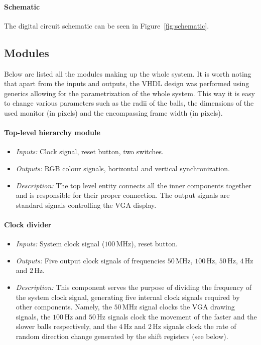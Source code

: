 \documentclass[11pt,a4paper]{article}
\def\MHz{\,\mathrm{MHz}}
\def\Hz{\,\mathrm{Hz}}
\begin{document}
        \paragraph{Schematic} The digital circuit schematic can be seen in Figure~\ref{fig:schematic}.

    \subsection*{Modules}
        Below are listed all the modules making up the whole system. It is worth noting that apart from the inputs and outputs, the VHDL design was performed using generics allowing for the parametrization of the whole system. This way it is easy to change various parameters such as the radii of the balls, the dimensions of the used monitor (in pixels) and the encompassing frame width (in pixels).

        \paragraph{Top-level hierarchy module}
        \begin{itemize}
            \item \emph{Inputs:} Clock signal, reset button, two switches.
            \item \emph{Outputs:} RGB colour signals, horizontal and vertical synchronization.
            \item \emph{Description:} The top level entity connects all the inner components together and is responsible for their proper connection. The output signals are standard signals controlling the VGA display.
        \end{itemize}

        \paragraph{Clock divider}
        \begin{itemize}
            \item \emph{Inputs:} System clock signal ($100\MHz$), reset button.
            \item \emph{Outputs:} Five output clock signals of frequencies $50\MHz$, $100\Hz$, $50\Hz$, $4\Hz$ and $2\Hz$.
            \item \emph{Description:} This component serves the purpose of dividing the frequency of the system clock signal, generating five internal clock signals required by other components. Namely, the $50\MHz$ signal clocks the VGA drawing signals, the $100\Hz$ and $50\Hz$ signals clock the movement of the faster and the slower balls respectively, and the $4\Hz$ and $2\Hz$ signals clock the rate of random direction change generated by the shift registers (see below).
        \end{itemize}
\end{document}
